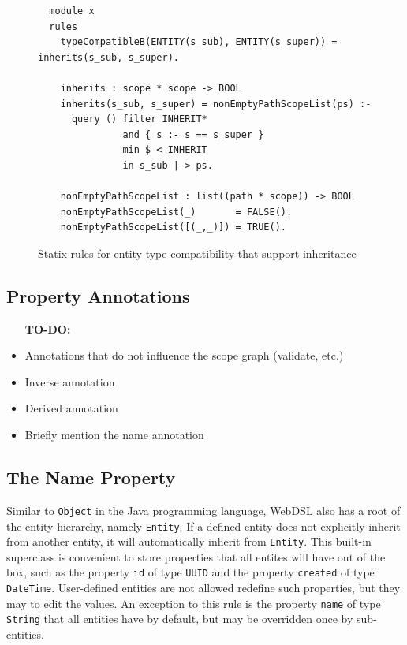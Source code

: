       \begin{figure}
        \begin{verbatim}
  module x
  rules
    typeCompatibleB(ENTITY(s_sub), ENTITY(s_super)) = inherits(s_sub, s_super).

    inherits : scope * scope -> BOOL
    inherits(s_sub, s_super) = nonEmptyPathScopeList(ps) :-
      query () filter INHERIT*
               and { s :- s == s_super }
               min $ < INHERIT
               in s_sub |-> ps.

    nonEmptyPathScopeList : list((path * scope)) -> BOOL
    nonEmptyPathScopeList(_)       = FALSE().
    nonEmptyPathScopeList([(_,_)]) = TRUE().
        \end{verbatim}
        \caption{\label{fig:entity-type-compatibility-inheritance}Statix rules for entity type compatibility that support inheritance}
      \end{figure}

    \subsection{Property Annotations}

      \begin{itemize}
        \item [\textbf{TO-DO:}]
        \item Annotations that do not influence the scope graph (validate, etc.)
        \item Inverse annotation
        \item Derived annotation
        \item Briefly mention the name annotation
      \end{itemize}

    \subsection{The Name Property}

      Similar to \texttt{Object} in the Java programming language, WebDSL also has a root of the entity hierarchy, namely \texttt{Entity}. If a defined entity does not explicitly inherit from another entity, it will automatically inherit from \texttt{Entity}. This built-in superclass is convenient to store properties that all entites will have out of the box, such as the property \texttt{id} of type \texttt{UUID} and the property \texttt{created} of type \texttt{DateTime}. User-defined entities are not allowed redefine such properties, but they may to edit the values. An exception to this rule is the property \texttt{name} of type \texttt{String} that all entities have by default, but may be overridden once by sub-entities.

